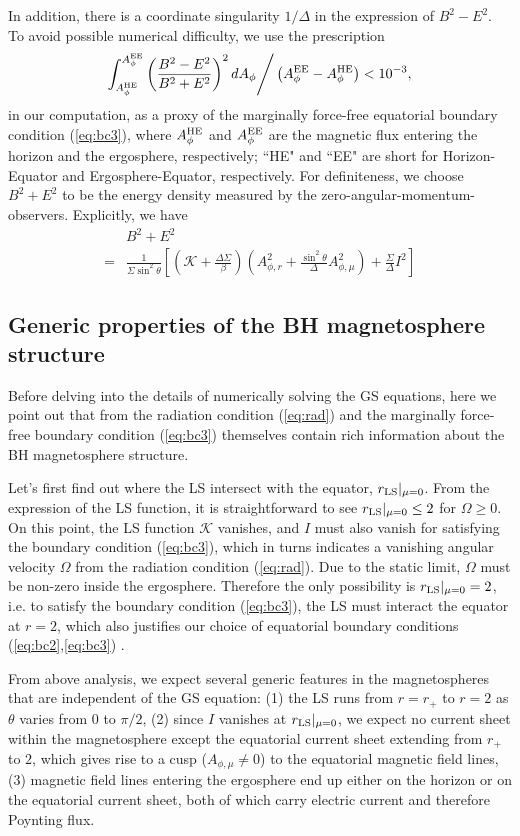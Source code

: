 \documentclass[aps,prd,reprint,nofootinbib, superscriptaddress]{revtex4-1}
\def\sst{\sin^2\theta}
\def\Ar{A_{\phi,r}}
\def\Am{A_{\phi,\mu}}
\def\be{\begin{equation}}
\def\ee{\end{equation}}
\def\AHE{A_\phi^{\rm HE}}
\def\AEE{A_\phi^{\rm EE}}
\begin{document}
In addition, there is a coordinate singularity $1/\Delta$ in the expression of $B^2-E^2$.
To avoid possible numerical difficulty, we use the prescription
\be
\label{eq:nbc}
\int_{A_\phi^{\rm HE}}^{A_\phi^{\rm EE}} \left(\frac{B^2-E^2}{B^2+E^2}\right)^2 dA_\phi \Bigg/ \left(A_\phi^{\rm EE}- A_\phi^{\rm HE}\right)  < 10^{-3},
\ee
in our computation, as a proxy of the marginally force-free equatorial boundary condition (\ref{eq:bc3}),
where $\AHE$ and $\AEE$ are the magnetic flux entering the horizon and the ergosphere, respectively;
``HE" and ``EE" are short for Horizon-Equator and Ergosphere-Equator, respectively.
For definiteness, we choose $B^2+E^2$ to be the energy density measured by the zero-angular-momentum-observers.
Explicitly, we have
\be
\begin{aligned}
 & B^2+E^2   \\
=& \frac{1}{\Sigma \sst} \left[ \left(\mathcal{K}+\frac{\Delta\Sigma}{\beta} \right)
 \left(\Ar^2 +\frac{\sst}{\Delta}\Am^2 \right)
 +\frac{\Sigma}{\Delta}I^2\right]
\end{aligned}
\ee

\subsection{Generic properties of the BH magnetosphere structure}
\label{subsec:features}
Before delving into the details of numerically solving the GS equations,
here we point out that from the radiation condition (\ref{eq:rad}) and the marginally
force-free boundary condition (\ref{eq:bc3})
themselves contain rich information about the BH magnetosphere structure.

Let's first find out where the LS intersect with the equator, $r_{\rm LS}|_{\mu=0}$.
From the expression of the LS function, it is straightforward to see $ r_{\rm LS}|_{\mu=0} \leq 2$ for $\Omega \geq 0$.
On this point,  the LS function $\mathcal K$ vanishes,
and $I$ must also vanish for satisfying the boundary condition (\ref{eq:bc3}),
which in turns indicates a vanishing angular velocity $\Omega$ from
the radiation condition (\ref{eq:rad}).  Due to the static limit, $\Omega$
must be non-zero inside the ergosphere.  Therefore the only possibility is  $r_{\rm LS}|_{\mu=0} = 2$, i.e.
to satisfy the boundary condition (\ref{eq:bc3}), the LS must interact the equator at $r=2$, which also
justifies our choice of equatorial boundary conditions (\ref{eq:bc2},\ref{eq:bc3}) .

From above analysis, we expect several generic features in the magnetospheres that are independent
of the GS equation:
(1) the LS runs from $r=r_+$ to $r=2$ as $\theta$ varies from $0$ to $\pi/2$,
(2) since $I$ vanishes at $r_{\rm LS}|_{\mu=0}$, we expect no current sheet within the magnetosphere except the equatorial current
sheet extending from $r_+$ to $2$, which gives rise to a cusp ($\Am \neq 0$) to the equatorial magnetic field lines,
(3) magnetic field lines entering the ergosphere end up either on the horizon or on the equatorial current sheet,
both of which carry electric current and therefore Poynting flux.
\end{document}
